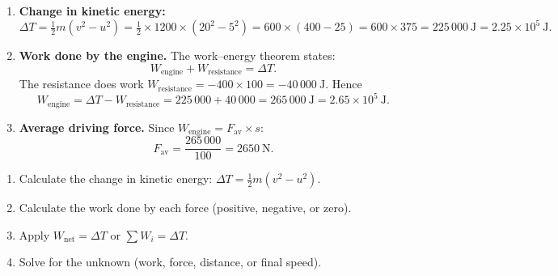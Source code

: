 \documentclass[11pt]{article}
\begin{document}
\begin{corrige}
\begin{enumerate}
\item \textbf{Change in kinetic energy:}
\[
\Delta T = \tfrac{1}{2}m\left(v^{2}-u^{2}\right) = \tfrac{1}{2}\times 1200\times\left(20^{2}-5^{2}\right) = 600\times(400-25) = 600\times 375 = 225\,000\ \mathrm{J} = 2.25\times 10^{5}\ \mathrm{J}.
\]

\item \textbf{Work done by the engine.} The work--energy theorem states:
\[
W_{\text{engine}} + W_{\text{resistance}} = \Delta T.
\]
The resistance does work $W_{\text{resistance}} = -400\times 100 = -40\,000\ \mathrm{J}$. Hence
\[
W_{\text{engine}} = \Delta T - W_{\text{resistance}} = 225\,000 + 40\,000 = 265\,000\ \mathrm{J} = 2.65\times 10^{5}\ \mathrm{J}.
\]

\item \textbf{Average driving force.} Since $W_{\text{engine}} = F_{\text{av}}\times s$:
\[
F_{\text{av}} = \frac{265\,000}{100} = 2650\ \mathrm{N}.
\]
\end{enumerate}

\begin{methode}
\begin{enumerate}
\item Calculate the change in kinetic energy: $\Delta T = \frac{1}{2}m(v^2 - u^2)$.
\item Calculate the work done by each force (positive, negative, or zero).
\item Apply $W_{\text{net}} = \Delta T$ or $\sum W_i = \Delta T$.
\item Solve for the unknown (work, force, distance, or final speed).
\end{enumerate}
\end{methode}
\end{corrige}
\end{document}

